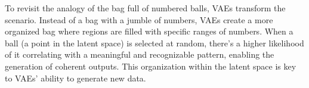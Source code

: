 To revisit the analogy of the bag full of numbered balls, VAEs transform the scenario. Instead of a bag with a jumble of numbers, VAEs create a more organized bag where regions are filled with specific ranges of numbers. When a ball (a point in the latent space) is selected at random, there's a higher likelihood of it correlating with a meaningful and recognizable pattern, enabling the generation of coherent outputs. This organization within the latent space is key to VAEs' ability to generate new data.

